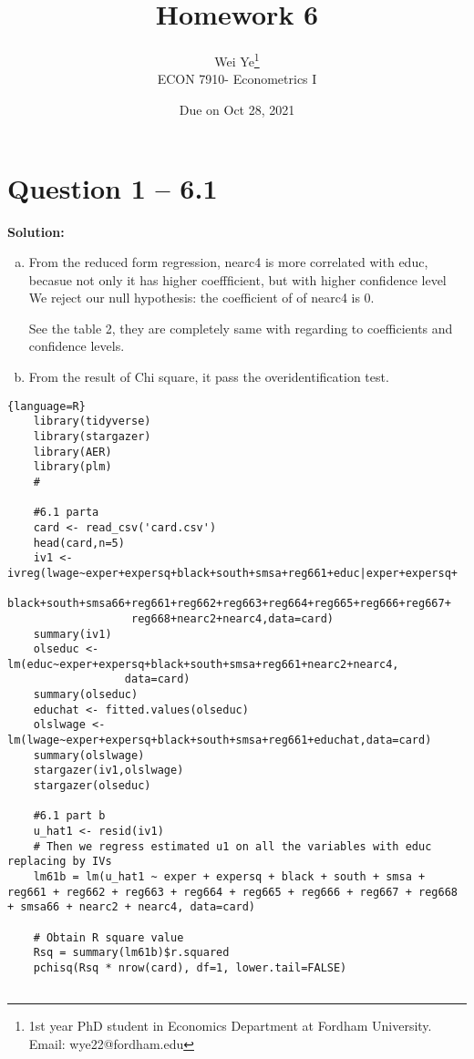 \documentclass[11pt]{article} %
\title{Homework 6}
\author{Wei Ye\footnote{ 1st year PhD student in Economics Department at Fordham University. Email: wye22@fordham.edu}
    \\ ECON 7910- Econometrics I}
\date{Due on Oct 28, 2021}
\begin{document}
\maketitle

\section{Question 1 -- 6.1}
\textbf{Solution:}
\begin{enumerate}[a)]
    \item From the reduced form regression, nearc4 is more correlated with educ, becasue not only it has higher coeffficient, but with higher confidence level We
            reject our null hypothesis: the coefficient of of nearc4 is 0.

            See the table 2, they are completely same with regarding to coefficients and confidence levels.
    \item  From the result of Chi square, it pass the overidentification test.
\end{enumerate}

\begin{lstlisting}{language=R}
    library(tidyverse)
    library(stargazer)
    library(AER)
    library(plm)
    #
    
    #6.1 parta
    card <- read_csv('card.csv')
    head(card,n=5)
    iv1 <- ivreg(lwage~exper+expersq+black+south+smsa+reg661+educ|exper+expersq+
                   black+south+smsa66+reg661+reg662+reg663+reg664+reg665+reg666+reg667+
                   reg668+nearc2+nearc4,data=card)
    summary(iv1)
    olseduc <- lm(educ~exper+expersq+black+south+smsa+reg661+nearc2+nearc4,
                  data=card)
    summary(olseduc)
    educhat <- fitted.values(olseduc)
    olslwage <- lm(lwage~exper+expersq+black+south+smsa+reg661+educhat,data=card)
    summary(olslwage)
    stargazer(iv1,olslwage)
    stargazer(olseduc)
    
    #6.1 part b
    u_hat1 <- resid(iv1)
    # Then we regress estimated u1 on all the variables with educ replacing by IVs
    lm61b = lm(u_hat1 ~ exper + expersq + black + south + smsa + reg661 + reg662 + reg663 + reg664 + reg665 + reg666 + reg667 + reg668 + smsa66 + nearc2 + nearc4, data=card)
    
    # Obtain R square value
    Rsq = summary(lm61b)$r.squared
    pchisq(Rsq * nrow(card), df=1, lower.tail=FALSE)


\end{lstlisting}
\end{document}
